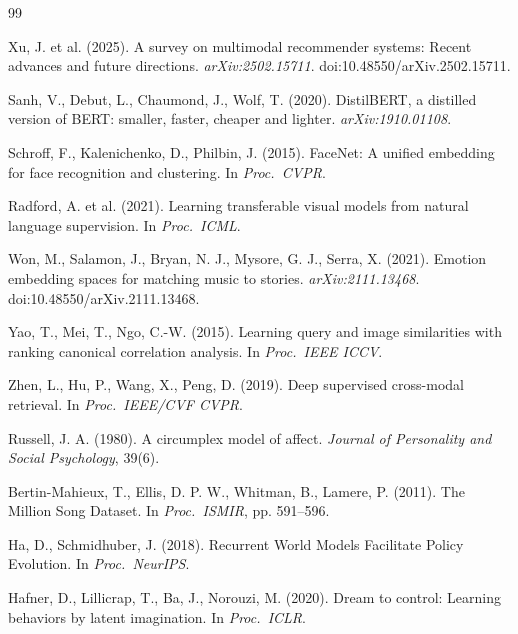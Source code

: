 \documentclass[11pt]{article}
\begin{document}

\begin{thebibliography}{99}


Xu, J. et al. (2025).
\newblock A survey on multimodal recommender systems: Recent advances and
future directions. \emph{arXiv:2502.15711}.
\newblock doi:10.48550/arXiv.2502.15711.

Sanh, V., Debut, L., Chaumond, J., Wolf, T. (2020).
\newblock DistilBERT, a distilled version of BERT: smaller, faster,
cheaper and lighter. \emph{arXiv:1910.01108}.

Schroff, F., Kalenichenko, D., Philbin, J. (2015).
\newblock FaceNet: A unified embedding for face recognition and
clustering. In \emph{Proc.\ CVPR}.

Radford, A. et al. (2021).
\newblock Learning transferable visual models from natural language
supervision. In \emph{Proc.\ ICML}.

Won, M., Salamon, J., Bryan, N. J., Mysore, G. J., Serra, X. (2021).
\newblock Emotion embedding spaces for matching music to stories.
\emph{arXiv:2111.13468}.
\newblock doi:10.48550/arXiv.2111.13468.

Yao, T., Mei, T., Ngo, C.-W. (2015).
\newblock Learning query and image similarities with ranking canonical
correlation analysis. In \emph{Proc.\ IEEE ICCV}.

Zhen, L., Hu, P., Wang, X., Peng, D. (2019).
\newblock Deep supervised cross-modal retrieval. In \emph{Proc.\ IEEE/CVF
CVPR}.

Russell, J. A. (1980).
\newblock A circumplex model of affect. \emph{Journal of Personality and
Social Psychology}, 39(6).

Bertin-Mahieux, T., Ellis, D. P. W., Whitman, B., Lamere, P. (2011).
\newblock The Million Song Dataset. In \emph{Proc.\ ISMIR}, pp. 591--596.

Ha, D., Schmidhuber, J. (2018).
\newblock Recurrent World Models Facilitate Policy Evolution. In \emph{Proc.\ NeurIPS}.

Hafner, D., Lillicrap, T., Ba, J., Norouzi, M. (2020).
\newblock Dream to control: Learning behaviors by latent imagination.
In \emph{Proc.\ ICLR}.


\end{thebibliography}
\end{document}
